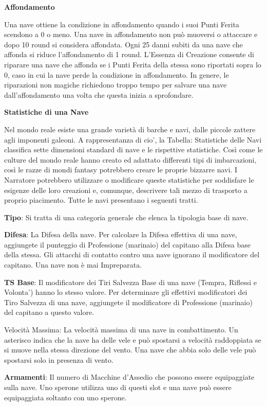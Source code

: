 \documentclass[a4paper,11pt,twoside,openany]{book}
\begin{document}
\textbf{Affondamento}

Una nave ottiene la condizione in affondamento quando i suoi Punti Ferita scendono a 0 o meno. Una nave in affondamento non può muoversi o attaccare e dopo 10 round si considera affondata. Ogni 25 danni subiti da una nave che affonda si riduce l'affondamento di 1 round. L’Essenza di Creazione consente di riparare una nave che affonda se i Punti Ferita della stessa sono riportati sopra lo 0, caso in cui la nave perde la condizione in affondamento. In genere, le riparazioni non magiche richiedono troppo tempo per salvare una nave dall'affondamento una volta che questa inizia a sprofondare.

\textbf{Statistiche di una Nave}

Nel mondo reale esiste una grande varietà di barche e navi, dalle piccole zattere agli imponenti galeoni. A rappresentanza di cio', la Tabella: Statistiche delle Navi classifica sette dimensioni standard di nave e le rispettive statistiche. Così come le culture del mondo reale hanno creato ed adattato differenti tipi di imbarcazioni, così le razze di mondi fantasy potrebbero creare le proprie bizzarre navi.
I Narratore potrebbero utilizzare o modificare queste statistiche per soddisfare le esigenze delle loro creazioni e, comunque, descrivere tali mezzo di trasporto a proprio piacimento. Tutte le navi presentano i seguenti tratti.

\textbf{Tipo}: Si tratta di una categoria generale che elenca la tipologia base di nave.

\textbf{Difesa}: La Difesa della nave. Per calcolare la Difesa effettiva di una nave, aggiungete il punteggio di Professione (marinaio) del capitano alla Difesa base della stessa. Gli attacchi di contatto contro una nave ignorano il modificatore del capitano. Una nave non è mai Impreparata.

\textbf{TS Base}: Il modificatore dei Tiri Salvezza Base di una nave (Tempra, Riflessi e Volonta') hanno lo stesso valore. Per determinare gli effettivi modificatori dei Tiro Salvezza di una nave, aggiungete il modificatore di Professione (marinaio) del capitano a questo valore.

Velocità Massima: La velocità massima di una nave in combattimento. Un asterisco indica che la nave ha delle vele e può spostarsi a velocità raddoppiata se si muove nella stessa direzione del vento. Una nave che abbia solo delle vele può spostarsi solo in presenza di vento.

\textbf{Armamenti}: Il numero di Macchine d'Assedio che possono essere equipaggiate sulla nave. Uno sperone utilizza uno di questi slot e una nave può essere equipaggiata soltanto con uno sperone.
\end{document}
